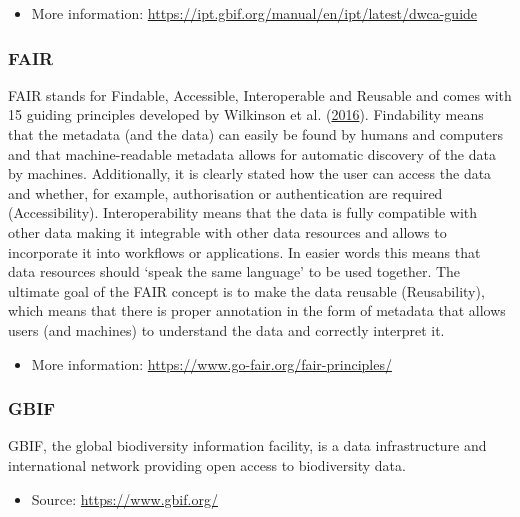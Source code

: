 \documentclass[
]{book}
\providecommand{\tightlist}{%
  \setlength{\itemsep}{0pt}\setlength{\parskip}{0pt}}
\begin{document}
\begin{itemize}
\tightlist
\item
  More information: \url{https://ipt.gbif.org/manual/en/ipt/latest/dwca-guide}
\end{itemize}

\hypertarget{FAIR}{%
\subsubsection*{FAIR}\label{FAIR}}

FAIR stands for Findable, Accessible, Interoperable and Reusable and comes with 15 guiding principles developed by Wilkinson et al. (\protect\hyperlink{ref-Wilkinson_2016}{2016}). Findability means that the metadata (and the data) can easily be found by humans and computers and that machine-readable metadata allows for automatic discovery of the data by machines. Additionally, it is clearly stated how the user can access the data and whether, for example, authorisation or authentication are required (Accessibility). Interoperability means that the data is fully compatible with other data making it integrable with other data resources and allows to incorporate it into workflows or applications. In easier words this means that data resources should `speak the same language' to be used together. The ultimate goal of the FAIR concept is to make the data reusable (Reusability), which means that there is proper annotation in the form of metadata that allows users (and machines) to understand the data and correctly interpret it.

\begin{itemize}
\tightlist
\item
  More information: \url{https://www.go-fair.org/fair-principles/}
\end{itemize}

\hypertarget{GBIF}{%
\subsubsection*{GBIF}\label{GBIF}}

GBIF, the global biodiversity information facility, is a data infrastructure and international network providing open access to biodiversity data.

\begin{itemize}
\tightlist
\item
  Source: \url{https://www.gbif.org/}
\end{itemize}
\end{document}
